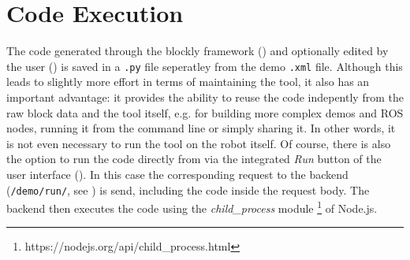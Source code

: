 \section{Code Execution} \label{sec:CodeExecution}
The code generated through the blockly framework () and optionally edited by the user () is saved in a \lstinline!.py! file seperatley from the demo \lstinline!.xml! file. Although this leads to slightly more effort in terms of maintaining the tool, it also has an important advantage: it provides the ability to reuse the code indepently from the raw block data and the tool itself, e.g. for building more complex demos and ROS nodes, running it from the command line or simply sharing it. In other words, it is not even necessary to run the tool on the robot itself. Of course, there is also the option to run the code directly from \toolname{} via the integrated \textit{Run} button of the user interface (). In this case the corresponding request to the backend (\lstinline!/demo/run/!, see ) is send, including the code inside the request body. The backend then executes the code using the \textit{child\_process} module \footnote{https://nodejs.org/api/child\_process.html} of Node.js.